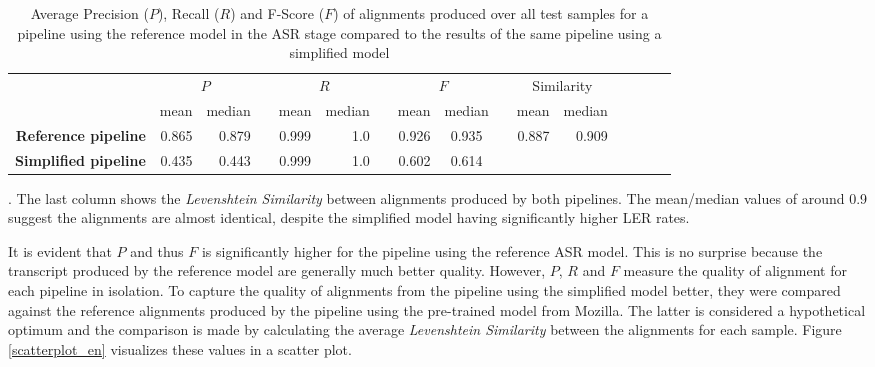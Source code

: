 \documentclass[letterpaper]{article}
\begin{document}
\begin{table}[h!]
	\centering
	\begin{tabular}{@{}rrrrcrrrcrrrcrrr@{}}
		\toprule
		& \multicolumn{2}{c}{$P$} & \phantom{abc} & \multicolumn{2}{c}{$R$} & \phantom{abc} & \multicolumn{2}{c}{$F$} & \phantom{abc} & \multicolumn{2}{c}{Similarity}\\
		\cmidrule{2-3} \cmidrule{5-6} \cmidrule{8-9} \cmidrule{11-12}
		& mean & median && mean & median && mean & median && mean & median\\ 
		\midrule
		\textbf{Reference pipeline} & 0.865 & 0.879 && 0.999 & 1.0 && 0.926 & 0.935 && \multirow{2}{*}{0.887} & \multirow{2}{*}{0.909} \\
		\textbf{Simplified pipeline} & 0.435 & 0.443 && 0.999 & 1.0 && 0.602 & 0.614 \\
		\bottomrule
	\end{tabular}
	\caption{Average Precision ($P$), Recall ($R$) and F-Score ($F$) of alignments produced over all test samples for a pipeline using the reference model in the ASR stage compared to the results of the same pipeline using a simplified model}. The last column shows the \textit{Levenshtein Similarity} between alignments produced by both pipelines. The mean/median values of around 0.9 suggest the alignments are almost identical, despite the simplified model having significantly higher LER rates.
	\label{prf_en}
\end{table}

It is evident that $P$ and thus $F$ is significantly higher for the pipeline using the reference ASR model. This is no surprise because the transcript produced by the reference model are generally much better quality. However, $P$, $R$ and $F$ measure the quality of alignment for each pipeline in isolation. To capture the quality of alignments from the pipeline using the simplified model better, they were compared against the reference alignments produced by the pipeline using the pre-trained model from Mozilla. The latter is considered a hypothetical optimum and the comparison is made by calculating the average \textit{Levenshtein Similarity} between the alignments for each sample. Figure \ref{scatterplot_en} visualizes these values in a scatter plot.
\end{document}
